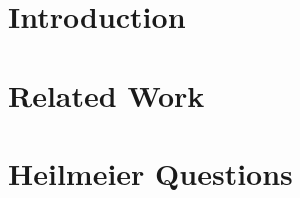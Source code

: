 \documentclass[sigchi, 12pt, nonacm=true, timestamp=true, screen=true]{acmart}
\begin{document}



\maketitle
\section{Introduction}

\section{Related Work}

\section{Heilmeier Questions}


%
%
%
%
%
%
%	
%
%
\end{document}
